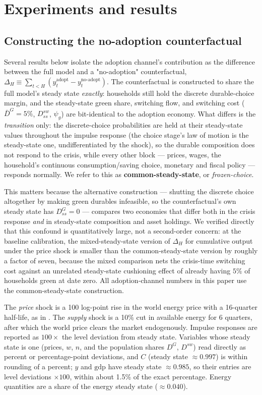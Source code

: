 \documentclass[11pt,a4paper]{article}
\begin{document}
\section{Experiments and results}

\subsection{Constructing the no-adoption counterfactual}
\label{sec:counterfactual}

Several results below isolate the adoption channel's contribution as the
difference between the full model and a "no-adoption" counterfactual,
$\Delta_H\equiv\sum_{t<H}(y^{\mathrm{adopt}}_t-y^{\mathrm{no\text{-}adopt}}_t)$.
The counterfactual is constructed to share the full model's steady state
\emph{exactly}: households still hold the discrete durable-choice margin, and
the steady-state green share, switching flow, and switching cost
($\bar D^{G}=5\%$, $D^{sw}_{ss}$, $\psi_g$) are bit-identical to the adoption
economy. What differs is the \emph{transition} only: the discrete-choice
probabilities are held at their steady-state values throughout the impulse
response (the choice stage's law of motion is the steady-state one, undifferentiated
by the shock), so the durable composition does not respond to the crisis, while
every other block --- prices, wages, the household's continuous
consumption/saving choice, monetary and fiscal policy --- responds normally. We
refer to this as \textbf{common-steady-state}, or \emph{frozen-choice}.

This matters because the alternative construction --- shutting the discrete
choice altogether by making green durables infeasible, so the counterfactual's
own steady state has $D^{G}_{ss}=0$ --- compares two economies that differ both
in the crisis response \emph{and} in steady-state composition and asset
holdings. We verified directly that this confound is quantitatively large, not
a second-order concern: at the baseline calibration, the mixed-steady-state
version of $\Delta_H$ for cumulative output under the price shock is smaller
than the common-steady-state version by roughly a factor of seven, because the
mixed comparison nets the crisis-time switching cost against an unrelated
steady-state cushioning effect of already having $5\%$ of households green at
date zero. All adoption-channel numbers in this paper use the common-steady-state
construction.


The \emph{price} shock is a 100 log-point rise in the world energy price with
a 16-quarter half-life, as in \citet{ARS2024}. The \emph{supply} shock is a 10\%
cut in available energy for 6 quarters, after which the world price clears
the market endogenously. Impulse responses are reported as $100\times$ the
level deviation from steady state. Variables whose steady state is one (prices,
$w$, $n$, and the population shares $D^{G}$, $D^{sw}$) read directly as percent
or percentage-point deviations, and $C$ (steady state $\approx0.997$) is within
rounding of a percent; $y$ and $\mathrm{gdp}$ have steady state
$\approx0.985$, so their entries are level deviations $\times100$, within about
1.5\% of the exact percentage. Energy quantities are a share of the energy
steady state ($\approx0.040$).
\end{document}
